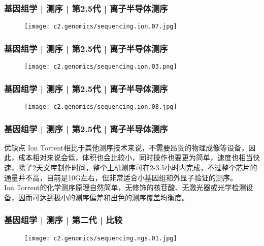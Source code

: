 \begin{frame}
  \frametitle{基因组学 | 测序 | 第2.5代 | 离子半导体测序}
  \begin{figure}
    \centering
    \texttt{[image: c2.genomics/sequencing.ion.07.jpg]}
  \end{figure}
\end{frame}

\begin{frame}
  \frametitle{基因组学 | 测序 | 第2.5代 | 离子半导体测序}
  \begin{figure}
    \centering
    \texttt{[image: c2.genomics/sequencing.ion.03.png]}
  \end{figure}
\end{frame}

\begin{frame}
  \frametitle{基因组学 | 测序 | 第2.5代 | 离子半导体测序}
  \begin{figure}
    \centering
    \texttt{[image: c2.genomics/sequencing.ion.08.jpg]}
  \end{figure}
\end{frame}

\begin{frame}
  \frametitle{基因组学 | 测序 | 第2.5代 | 离子半导体测序}
  \begin{block}{优缺点}
Ion Torrent相比于其他测序技术来说，不需要昂贵的物理成像等设备，因此，成本相对来说会低，体积也会比较小，同时操作也要更为简单，速度也相当快速，除了2天文库制作时间，整个上机测序可在2-3.5小时内完成，不过整个芯片的通量并不高，目前是10G左右，但非常适合小基因组和外显子验证的测序。\\
\vspace{1em}
Ion Torrent的化学测序原理自然简单，无修饰的核苷酸、无激光器或光学检测设备，因而可达到极小的测序偏差和出色的测序覆盖均衡度。
  \end{block}
\end{frame}



\begin{frame}
  \frametitle{基因组学 | 测序 | 第二代 | 比较}
  \begin{figure}
    \centering
    \texttt{[image: c2.genomics/sequencing.ngs.01.jpg]}
  \end{figure}
\end{frame}

